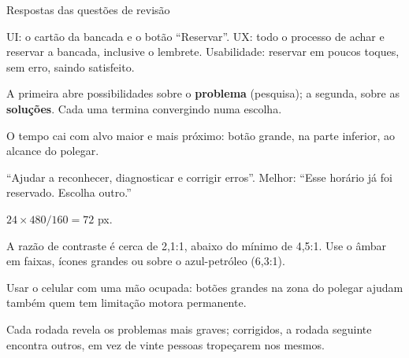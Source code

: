 \documentclass[aspectratio=169,10pt]{beamer}
\begin{document}
\begin{frame}{Respostas das questões de revisão}
  \begin{respostas}
    \item UI: o cartão da bancada e o botão ``Reservar''. UX: todo o processo de achar e reservar a bancada, inclusive o lembrete. Usabilidade: reservar em poucos toques, sem erro, saindo satisfeito.
    \item A primeira abre possibilidades sobre o \textbf{problema} (pesquisa); a segunda, sobre as \textbf{soluções}. Cada uma termina convergindo numa escolha.
    \item O tempo cai com alvo maior e mais próximo: botão grande, na parte inferior, ao alcance do polegar.
    \item ``Ajudar a reconhecer, diagnosticar e corrigir erros''. Melhor: ``Esse horário já foi reservado. Escolha outro.''
    \item $24 \times 480 / 160 = 72$ px.
    \item A razão de contraste é cerca de 2,1:1, abaixo do mínimo de 4,5:1. Use o âmbar em faixas, ícones grandes ou sobre o azul-petróleo (6,3:1).
    \item Usar o celular com uma mão ocupada: botões grandes na zona do polegar ajudam também quem tem limitação motora permanente.
    \item Cada rodada revela os problemas mais graves; corrigidos, a rodada seguinte encontra outros, em vez de vinte pessoas tropeçarem nos mesmos.
  \end{respostas}
\end{frame}

\end{document}

